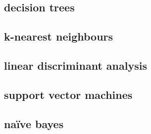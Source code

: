 \subsection{decision trees}
\subsection{k-nearest neighbours}
\subsection{linear discriminant analysis}
\subsection{support vector machines}
\subsection{naïve bayes}
